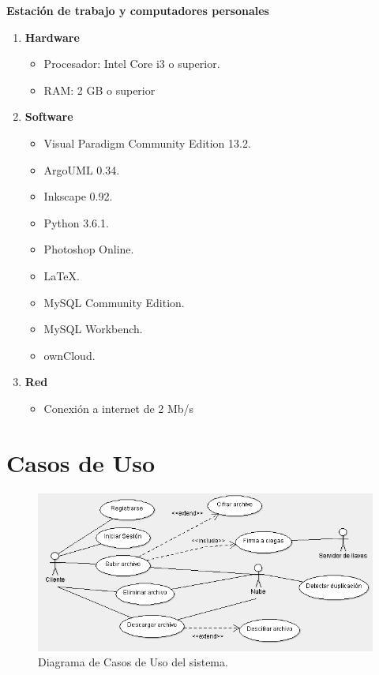 \textbf{Estación de trabajo y computadores personales}
\begin{enumerate}
\item \textbf{Hardware}
\begin{itemize}
\item Procesador: Intel Core i3 o superior.
\item RAM: 2 GB o superior
\end{itemize}
\item \textbf{Software}
\begin{itemize}
\item Visual Paradigm Community Edition 13.2.
\item ArgoUML 0.34.
\item Inkscape 0.92.
\item Python 3.6.1.
\item Photoshop Online.
\item LaTeX.
\item MySQL Community Edition.
\item MySQL Workbench.
\item ownCloud.
\end{itemize}
\item \textbf{Red}
\begin{itemize}
\item Conexión a internet de 2 Mb/s
\end{itemize}
\end{enumerate}

\section{Casos de Uso}

\begin{figure}[htbp!]
\centering
\includegraphics[width=1\textwidth]{images/CasosDeUso}
\caption{Diagrama de Casos de Uso del sistema.}
\end{figure}

